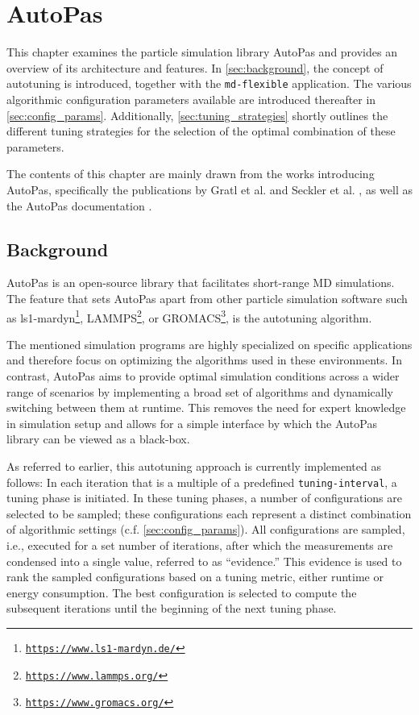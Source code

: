 \chapter[AutoPas]{AutoPas}
\label{cp:autopas}

{
	\parindent0pt
	This chapter examines the particle simulation library AutoPas and provides an overview of its architecture and features. In \autoref{sec:background}, the concept of autotuning is introduced, together with the \texttt{md-flexible} application.
	The various algorithmic configuration parameters available  are introduced thereafter in \autoref{sec:config_params}. Additionally, \autoref{sec:tuning_strategies} shortly outlines the different tuning strategies for the selection of the optimal combination of these parameters.

	The contents of this chapter are mainly drawn from the works introducing AutoPas, specifically the publications by Gratl et al. \cite{Gratl2019, Gratl2021, GratlGassner2025} and Seckler et al. \cite{Seckler2021}, as well as the AutoPas documentation \cite{AutoPas2025}.
}


\section{Background}
\label{sec:background}
AutoPas is an open-source \CC{} library that facilitates short-range MD simulations. The feature that sets AutoPas apart from other particle simulation software such as ls1-mardyn\footnote{\href{https://www.ls1-mardyn.de/}{\texttt{https://www.ls1-mardyn.de/}}}, LAMMPS\footnote{\href{https://www.lammps.org/}{\texttt{https://www.lammps.org/}}}, or GROMACS\footnote{\href{https://www.gromacs.org/}{\texttt{https://www.gromacs.org/}}}, is the autotuning algorithm.

The mentioned simulation programs are highly specialized on specific applications and therefore focus on optimizing the algorithms used in these environments.
In contrast, AutoPas aims to provide optimal simulation conditions across a wider range of scenarios by implementing a broad set of algorithms and dynamically switching between them at runtime.
This removes the need for expert knowledge in simulation setup and allows for a simple interface by which the AutoPas library can be viewed as a black-box.

As referred to earlier, this autotuning approach is currently implemented as follows: In each iteration that is a multiple of a predefined \texttt{tuning-interval}, a tuning phase is initiated. In these tuning phases, a number of configurations are selected to be sampled; these configurations each represent a distinct combination of algorithmic settings (c.f. \autoref{sec:config_params}). All configurations are sampled, i.e., executed for a set number of iterations, after which the measurements are condensed into a single value, referred to as \enquote{evidence.} This evidence is used to rank the sampled configurations based on a tuning metric, either runtime or energy consumption. The best configuration is selected to compute the subsequent iterations until the beginning of the next tuning phase.


